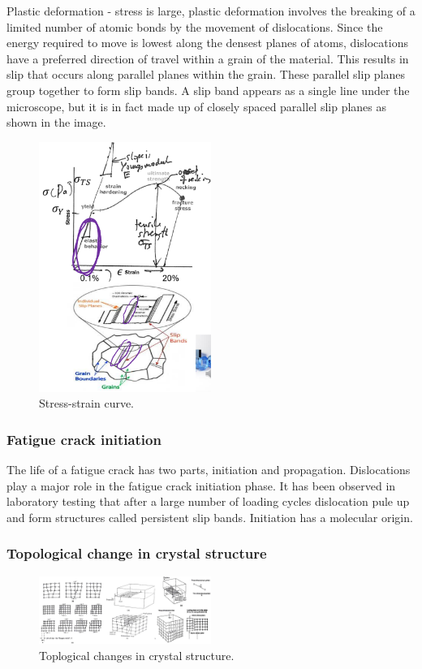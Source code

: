 Plastic deformation - stress is large, plastic deformation involves the breaking of a limited number of atomic bonds by the movement of dislocations. Since the energy required to move is lowest along the densest planes of atoms, dislocations have a preferred direction of travel within a grain of the material. This results in slip that occurs along parallel planes within the grain. These parallel slip planes group together to form slip bands. A slip band appears as a single line under the microscope, but it is in fact made up of closely spaced parallel slip planes as shown in the image. 
\begin{figure}[H]
	\centering
	\includegraphics[width = 0.5\textwidth]{./img/figure15.png}
	\caption{Stress-strain curve.}
\end{figure}
\subsubsection{Fatigue crack initiation}
The life of a fatigue crack has two parts, initiation and propagation. Dislocations play a major role in the fatigue crack initiation phase. It has been observed in laboratory testing that after a large number of loading cycles dislocation pule up and form structures called persistent slip bands. Initiation has a molecular origin.
\subsubsection{Topological change in crystal structure}
\begin{figure}[H]
	\centering
	\includegraphics[width = 0.5\textwidth]{./img/figure16.png}
	\caption{Toplogical changes in crystal structure.}
\end{figure}
